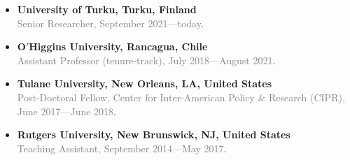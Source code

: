 \begin{itemize}
  \item[\textcolor{gray}{\textbullet}] {\bf University of Turku, Turku, Finland}\\
  \textcolor{gray}{Senior Researcher, September 2021---today}.

  \item[\textcolor{gray}{\textbullet}] {\bf O$'$Higgins University, Rancagua, Chile}\\
  \textcolor{gray}{Assistant Professor (tenure-track), July 2018---August 2021}.

  \item[\textcolor{gray}{\textbullet}] {\bf Tulane University, New Orleans, LA, United States}\\
  \textcolor{gray}{Post-Doctoral Fellow, Center for Inter-American Policy \& Research (CIPR), June 2017---June 2018}.

  \item[\textcolor{gray}{\textbullet}] {\bf Rutgers University, New Brunswick, NJ, United States}\\
 \textcolor{gray}{Teaching Assistant, September 2014---May 2017}.
\end{itemize}
